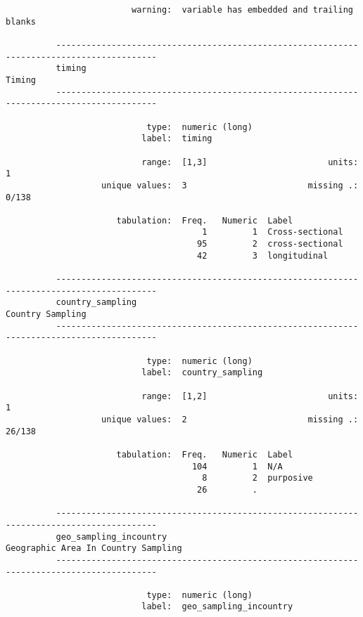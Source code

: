 \documentclass{article}
\begin{document}
\begin{verbatim}
                         warning:  variable has embedded and trailing blanks
          
          ------------------------------------------------------------------------------------------
          timing                                                                              Timing
          ------------------------------------------------------------------------------------------
          
                            type:  numeric (long)
                           label:  timing
          
                           range:  [1,3]                        units:  1
                   unique values:  3                        missing .:  0/138
          
                      tabulation:  Freq.   Numeric  Label
                                       1         1  Cross-sectional
                                      95         2  cross-sectional
                                      42         3  longitudinal
          
          ------------------------------------------------------------------------------------------
          country_sampling                                                          Country Sampling
          ------------------------------------------------------------------------------------------
          
                            type:  numeric (long)
                           label:  country_sampling
          
                           range:  [1,2]                        units:  1
                   unique values:  2                        missing .:  26/138
          
                      tabulation:  Freq.   Numeric  Label
                                     104         1  N/A
                                       8         2  purposive
                                      26         .  
          
          ------------------------------------------------------------------------------------------
          geo_sampling_incountry                                 Geographic Area In Country Sampling
          ------------------------------------------------------------------------------------------
          
                            type:  numeric (long)
                           label:  geo_sampling_incountry
          

\end{verbatim}
\end{document}
